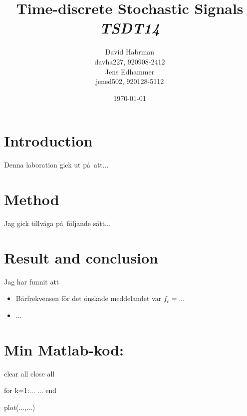 \documentclass[10pt]{article}
\title{Time-discrete Stochastic Signals\\
\emph{TSDT14}}
\author{David Habrman \\ davha227, 920908-2412\\
Jens Edhammer \\ jened502, 920128-5112 }
\date{\today}
\begin{document}
\maketitle

\section{Introduction}

Denna laboration gick ut p\aa\ att...

\section{Method}

Jag gick tillv\"aga p\aa\ f\"oljande s\"att...

\section{Result and conclusion}

Jag har funnit att
\begin{itemize}
\item B\"arfrekvensen f\"or det \"onskade meddelandet var $f_c=...$
\item ...
\end{itemize}

\clearpage

\section*{Min Matlab-kod:}
\begin{spverbatim}
clear all
close all

for k=1:...
  ...
end

plot(...,...)
\end{spverbatim}
\end{document}
